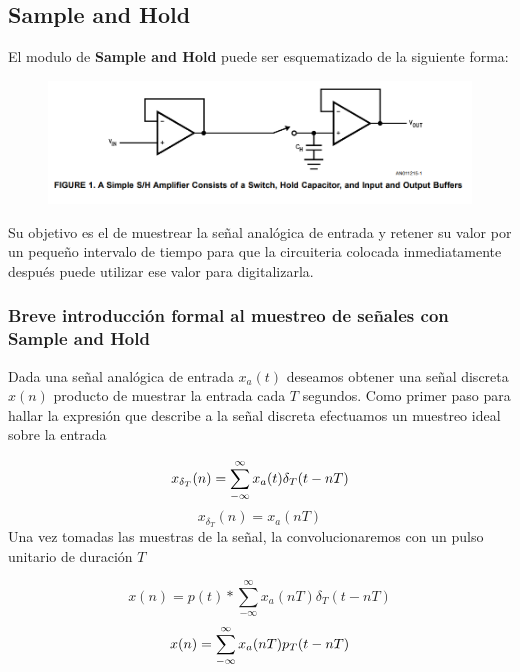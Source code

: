 %

%
\subsection{Sample and Hold}

El modulo de \textbf{Sample and Hold}  puede ser esquematizado de la siguiente forma:

\begin{figure}[H]
	\centering
	\includegraphics[width=0.7\linewidth]{ImagenesEjercicio4/SyH}
	\caption{}
	\label{fig:syh}
\end{figure}
Su objetivo es el de muestrear la señal analógica de entrada y retener su valor por un pequeño intervalo de tiempo para que la circuiteria colocada inmediatamente después puede utilizar ese valor para digitalizarla.
\subsubsection{Breve introducción formal al muestreo de señales con Sample and Hold}
Dada una señal analógica de entrada $x_{a}(t)$ deseamos obtener una señal discreta $x(n)$ producto de muestrar la entrada cada $T$ segundos.
Como primer paso para hallar la expresión que describe a la señal discreta efectuamos un muestreo ideal sobre la entrada

\begin{equation}
	\centering
	x_{\delta_{T}}(n)=\sum_{-\infty}^{\infty} x_{a}(t)\delta_{T}(t-nT)
	\label{
		muestreo_ideal}
\end{equation}
$$x_{\delta_{T}}(n) =x_{a}(nT) $$
Una vez tomadas las muestras de la señal, la convolucionaremos con un pulso unitario de duración $T$


$$x(n)=p(t)*\sum_{-\infty}^{\infty} x_{a}(nT)\delta_{T}(t-nT)$$
\begin{equation}
\centering
x(n)=\sum_{-\infty}^{\infty} x_{a}(nT)p_{T}(t-nT)
\end{equation}

